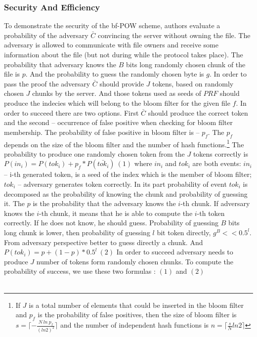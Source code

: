 \documentclass[12pt]{article}
\begin{document}
\subsubsection{Security And Efficiency}
\label{subsub:secAndeff6}


To demonstrate the security of the bf-POW scheme, authors evaluate a probability of the adversary $\bar{C}$ convincing the server without owning the file. The adversary is allowed to communicate with file owners and receive some information about the file (but not during while the protocol takes place). The probability that adversary knows the $B$ bits long randomly chosen chunk of the file is $p$. And the probability to guess the randomly chosen byte is $g$. In order to pass the proof the adversary $\bar{C}$ should provide $J$ tokens, based on randomly chosen $J$ chunks by the server. And those tokens used as seeds of $PRF$ should produce the indecies which will belong to the bloom filter for the given file $f$. In order to succeed there are two options. First $\bar{C}$ should produce the correct token and the second -- occurrence of false positive when checking for bloom filter membership. The probability of false positive in bloom filter is -- $p_f$. The $p_f$ depends on the size of the bloom filter and the number of hash functions.\footnote{If $J$ is a total number of elements that could be inserted in the bloom filter and $p_f$ is the probability of false positives, then the size of bloom filter is $s=\lceil - \frac {N\ ln\ p_f} {(ln2)^2}\rceil$ and the number of independent hash functions is $n=\lceil\frac{s} {N}ln2\rceil$} The probability to produce one randomly chosen token from the $J$ tokens correctly is $P(in_i)=P(tok_i)+p_f*P(\bar{tok_i}) \  (1)$ where $in_i$ and $tok_i$ are both events: $in_i$ --  i-th generated token, is a seed of the index which is the member of bloom filter; $tok_i$ -- adversary generates token correctly. In its part probability of event $tok_i$ is decomposed as the probability of knowing the chunk and probability of guessing it. The $p$ is the probability that the adversary knows the $i$-th chunk.  If adversary knows the $i$-th chunk, it means that he is able to compute the $i$-th token correctly. If he does not know, he should guess. Probability of guessing $B$ bits long chunk is lower, then probability of guessing $l$ bit token directly, $g^B << 0.5^l$. From adversary perspective better to guess directly a chunk. And $P(tok_i)=p+(1-p)*0.5^l \  (2) $ In order to succeed adversary needs to produce $J$ number of tokens form randomly chosen chunks. To compute the probability of success, we use these two formulas : $(1)$ and $(2)$\\\\
\end{document}
